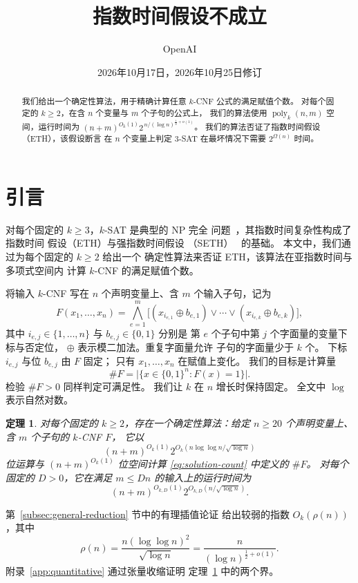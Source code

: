 \documentclass[11pt,reqno]{amsart}
\title{指数时间假设不成立}
\author{OpenAI}
\date{2026年10月17日，2026年10月25日修订}
\numberwithin{equation}{section}
\newtheorem{theorem}{定理}[section]
\theoremstyle{definition}\newtheorem{definition}[theorem]{定义}
\theoremstyle{remark}\newtheorem{remark}[theorem]{注}
\newcommand{\poly}{\operatorname{poly}}
\renewcommand{\le}{\leqslant}
\renewcommand{\ge}{\geqslant}
\begin{document}
\begin{abstract}
\normalsize
我们给出一个确定性算法，用于精确计算任意 $k$-CNF 公式的满足赋值个数。
对每个固定的 $k\ge2$，在含 $n$ 个变量与 $m$ 个子句的公式上，
我们的算法使用 $\poly_k(n,m)$ 空间，运行时间为
$(n+m)^{O_k(1)}2^{\,n/(\log n)^{\frac12+o(1)}}$。
我们的算法否证了指数时间假设（ETH），该假设断言
在 $n$ 个变量上判定 $3$-SAT 在最坏情况下需要
$2^{\Omega(n)}$ 时间。
\end{abstract}
\maketitle

\tableofcontents
\vspace{-\baselineskip}

\section{引言}
对每个固定的 $k\ge3$，$k$-SAT 是典型的 NP 完全
问题~\cite{Cook71}，其指数时间复杂性构成了指数时间
假设（ETH）与强指数时间假设
（SETH）~\cite{IP01,IPZ} 的基础。
本文中，我们通过为每个固定的 $k\ge2$ 给出一个
确定性算法来否证 ETH，该算法在亚指数时间与多项式空间内
计算 $k$-CNF 的满足赋值个数。

将输入 $k$-CNF 写在 $n$ 个声明变量上、含 $m$ 个输入子句，记为
\[
 F(x_1,\ldots,x_n)=\bigwedge_{e=1}^m
 \bigl[(x_{i_{e,1}}\oplus b_{e,1})\vee\cdots\vee
       (x_{i_{e,k}}\oplus b_{e,k})\bigr],
\]
其中 $i_{e,j}\in\{1,\ldots,n\}$ 与 $b_{e,j}\in\{0,1\}$ 分别是
第 $e$ 个子句中第 $j$ 个字面量的变量下标与否定位，
$\oplus$ 表示模二加法。重复字面量允许
子句的字面量少于 $k$ 个。
下标 $i_{e,j}$ 与位 $b_{e,j}$ 由 $F$ 固定；
只有 $x_1,\ldots,x_n$ 在赋值上变化。
我们的目标是计算量
\begin{equation}\label{eq:solution-count}
 \#F=\bigl|\{x\in\{0,1\}^n:F(x)=1\}\bigr|.
\end{equation}
检验 $\#F>0$ 同样判定可满足性。
我们让 $k$ 在 $n$ 增长时保持固定。
全文中 $\log$ 表示自然对数。
\begin{theorem}\label{thm:main}
对每个固定的 $k\ge2$，存在一个确定性算法：给定 $n\ge20$ 个声明变量上、含 $m$ 个子句的 $k$-CNF $F$，
它以
\[
 (n+m)^{O_k(1)}2^{O_k(n\log\log n/\sqrt{\log n})}
\]
位运算与 $(n+m)^{O_k(1)}$ 位空间计算 \eqref{eq:solution-count} 中定义的 $\#F$。
对每个固定的 $D>0$，它在满足 $m\le Dn$ 的输入上的运行时间为
\[
 (n+m)^{O_{k,D}(1)}2^{O_{k,D}(n/\sqrt{\log n})}.
\]
\end{theorem}

第~\ref{subsec:general-reduction} 节中的有理插值论证
给出较弱的指数 $O_k(\rho(n))$，其中
\[
 \rho(n)=\frac{n(\log\log n)^2}{\sqrt{\log n}}
          =\frac{n}{(\log n)^{\frac12+o(1)}}.
\]
附录~\ref{app:quantitative} 通过张量收缩证明
定理~\ref{thm:main} 中的两个界。
\end{document}
